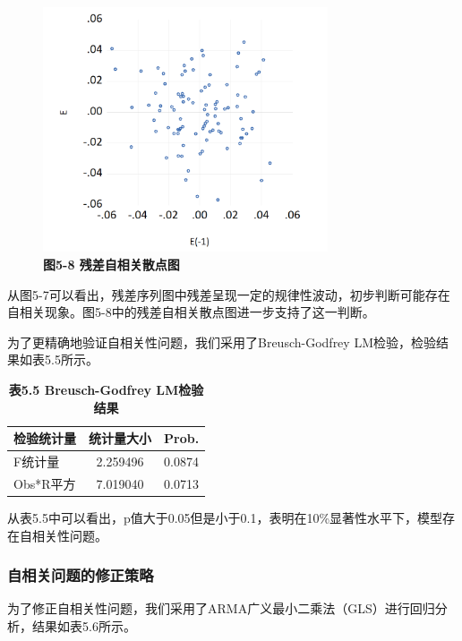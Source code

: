 \documentclass[12pt, a4paper]{article}
\numberwithin{equation}{section}
\begin{document}
\begin{figure}[h!]
    \centering
    \includegraphics[width=0.75\textwidth]{./img/e-e(-1).png}
    \captionsetup{labelformat=empty}
    \caption{\textbf{\fontsize{9pt}{11pt}\selectfont 图5-8 残差自相关散点图}}
\end{figure}

从图5-7可以看出，残差序列图中残差呈现一定的规律性波动，初步判断可能存在自相关现象。图5-8中的残差自相关散点图进一步支持了这一判断。

为了更精确地验证自相关性问题，我们采用了Breusch-Godfrey LM检验，检验结果如表5.5所示。

\begin{table}[h!]
    \centering
    \captionsetup{labelformat=empty}
    \caption{\textbf{\fontsize{9pt}{11pt}\selectfont 表5.5 Breusch-Godfrey LM检验结果}}
    \begin{tabular}{lcc}
        \toprule
        检验统计量   & 统计量大小    & Prob.  \\
        \midrule
        F统计量    & 2.259496 & 0.0874 \\
        Obs*R平方 & 7.019040 & 0.0713 \\
        \bottomrule
    \end{tabular}
\end{table}

从表5.5中可以看出，p值大于0.05但是小于0.1，表明在10\%显著性水平下，模型存在自相关性问题。

\subsubsection{自相关问题的修正策略}
为了修正自相关性问题，我们采用了ARMA广义最小二乘法（GLS）进行回归分析，结果如表5.6所示。
\end{document}
